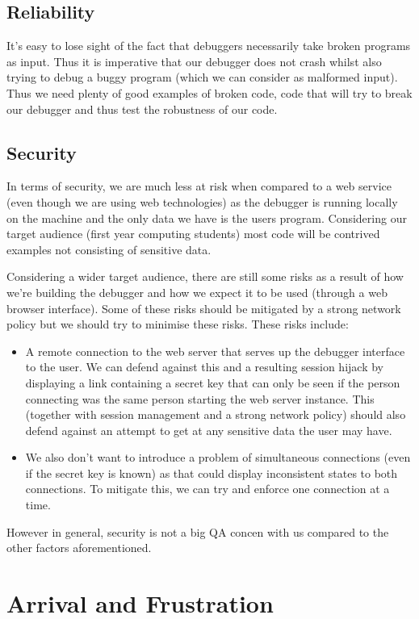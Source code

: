 \documentclass[11pt, a4paper]{article}
\begin{document}
\subsection{Reliability}
It's easy to lose sight of the fact that debuggers necessarily take broken programs as input. Thus it is imperative that our debugger does not crash whilst also trying to debug a buggy program (which we can consider as malformed input). Thus we need plenty of good examples of broken code, code that will try to break our debugger and thus test the robustness of our code.
\subsection{Security}
In terms of security, we are much less at risk when compared to a web service (even though we are using web technologies) as the debugger is running locally on the machine and the only data we have is the users program. Considering our target audience (first year computing students) most code will be contrived examples not consisting of sensitive data.

Considering a wider target audience, there are still some risks as a result of how we're building the debugger and how we expect it to be used (through a web browser interface). Some of these risks should be mitigated by a strong network policy but we should try to minimise these risks. These risks include:
\begin{itemize}
\item A remote connection to the web server that serves up the debugger interface to the user. We can defend against this and a resulting session hijack by displaying a link containing a secret key that can only be seen if the person connecting was the same person starting the web server instance. This (together with session management and a strong network policy) should also defend against an attempt to get at any sensitive data the user may have.
\item We also don't want to introduce a problem of simultaneous connections (even if the secret key is known) as that could display inconsistent states to both connections. To mitigate this, we can try and enforce one connection at a time.
\end{itemize}
However in general, security is not a big QA concen with us compared to the other factors aforementioned.
			
\section{Arrival and Frustration}
\end{document}
